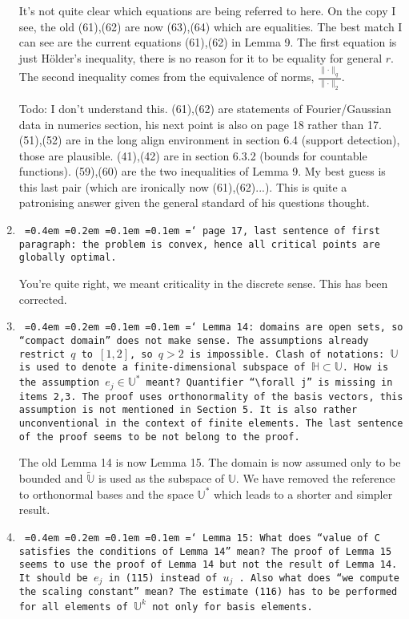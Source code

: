 \documentclass[12pt]{article}
\newcommand*\justify{%
	\fontdimen2\font=0.4em%
	\fontdimen3\font=0.2em%
	\fontdimen4\font=0.1em%
	\fontdimen7\font=0.1em%
	\hyphenchar\font=`\-%
}
\newcommand{\review}[1]{\texttt{\justify{#1}}}
\newcommand{\todo}[1]{{\color{red}Todo: #1}}
\newcommand{\F}[1]{\mathbb{#1}}
\begin{document}
\begin{enumerate}
	It's not quite clear which equations are being referred to here. On the copy I see, the old (61),(62) are now (63),(64) which are equalities. The best match I can see are the current equations (61),(62) in Lemma 9. The first equation is just H\"older's inequality, there is no reason for it to be equality for general $r$. The second inequality comes from the equivalence of norms, $\frac{\lVert\cdot\rVert_q}{\lVert\cdot\rVert_2}$.
	
	\todo{I don't understand this. (61),(62) are statements of Fourier/Gaussian data in numerics section, his next point is also on page 18 rather than 17. (51),(52) are in the long align environment in section 6.4 (support detection), those are plausible. (41),(42) are in section 6.3.2 (bounds for countable functions). (59),(60) are the two inequalities of Lemma 9. My best guess is this last pair (which are ironically now (61),(62)...). This is quite a patronising answer given the general standard of his questions thought.}
	
	\item \review{page 17, last sentence of first paragraph: the problem is convex, hence all critical points are globally optimal.}
	
	You're quite right, we meant criticality in the discrete sense. This has been corrected.
	
	\item \review{Lemma 14: domains are open sets, so ``compact domain'' does not make sense. The assumptions already restrict $q$ to $[1, 2]$, so $q > 2$ is impossible. Clash of notations: $\mathbb U$ is used to denote a finite-dimensional subspace of $\mathbb H \subset \mathbb U$. How is the assumption $e_j \in \mathbb U^*$ meant? Quantifier ``$\forall j$'' is missing in items 2,3. The proof uses orthonormality of the basis vectors, this assumption is not mentioned in Section 5. It is also rather unconventional in the context of finite elements. The last sentence of the proof seems to be not belong to the proof.}
	
	The old Lemma 14 is now Lemma 15. The domain is now assumed only to be bounded and $\tilde{\F{U}}$ is used as the subspace of $\F U$. We have removed the reference to orthonormal bases and the space $\F{U}^*$ which leads to a shorter and simpler result. 
		
	\item \review{Lemma 15: What does ``value of $C$ satisfies the conditions of Lemma 14'' mean? The proof of Lemma 15 seems to use the proof of Lemma 14 but not the result of Lemma 14. It should be $e_j$ in (115) instead of $u_j$ . Also what does ``we compute the scaling constant'' mean? The estimate (116) has to be performed for all elements of $\mathbb U^k$ not only for basis elements.}
	

\end{enumerate}
\end{document}
